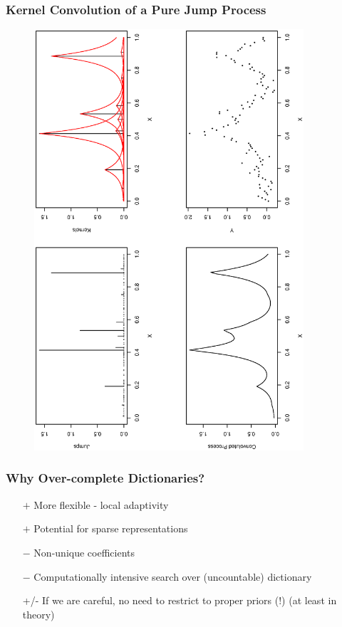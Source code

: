 \documentclass[dvips]{beamer}
\newcommand{\bs}[2]{\begin{frame} \frametitle{#1} 
{#2}
\end{frame} }
\begin{document}
\bs{Kernel Convolution of a Pure Jump Process} {
\begin{figure}[!h]
  \begin{center}
    \includegraphics[angle=270,origin=l,totalheight=6truecm,
     clip=1, width=10cm]{gammaproc2.ps}
  \end{center}
\end{figure}
}

\bs{Why Over-complete Dictionaries?} {
  \begin{itemize}
  \item[$+$] More flexible - local adaptivity
  \item[$+$] Potential for sparse representations
  \item[]
  \item[$-$] Non-unique coefficients
  \item[$-$] Computationally intensive search over (uncountable)
    dictionary 
\item[]
\item[+/-] If we are careful, no need to restrict to proper
  priors (!)  (at least in theory)
\end{itemize}
}
\end{document}
